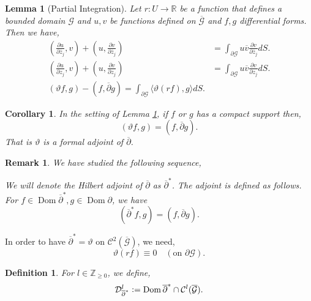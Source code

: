 \documentclass{article}
\newtheorem{definition}{Definition}[section]
\newtheorem{lemma}{Lemma}[section]
\newtheorem{remark}{Remark}[section]
\newtheorem{corollary}{Corollary} [section]
\DeclareMathOperator{\Dom}{Dom}
\newcommand{\defeq}{\vcentcolon=}
\newcommand{\R}[0]{\mathbb{R}}
\newcommand{\Z}[0]{\mathbb{Z}}
\newcommand{\G}[0]{\mathcal{G}}
\newcommand{\pd}[2]{{\frac {\partial#1} {\partial#2}}}
\newcommand{\bd}[0]{\partial}
\newcommand{\cbd}[0]{\overline{\partial}}
\begin{document}
  \begin{lemma}[Partial Integration]
    Let $r:U\to\R$ be a function that defines a bounded domain $\G$ and $u,v$ be functions defined on $\overline{\G}$ and $f,g$ differential forms. Then we have,
    \begin{align*}
      \left(\pd{u}{\overline{z}_j},v\right)+\left(u,\pd{v}{\overline{z}_j}\right)& = \int_{\bd \G}u\overline{v}\pd{v}{\overline{z}_j}dS.\\
      \left(\pd{u}{z_j},v\right)+\left(u,\pd{v}{z_j}\right)& = \int_{\bd \G}u\overline{v}\pd{v}{z_j}dS.\\
      (\vartheta f,g) - (f,\overline{\bd}g) = \int_{\bd\G}\langle\vartheta(rf),g\rangle dS.
    \end{align*}
    \label{lemma_parital_integration}
  \end{lemma}

  \begin{corollary}
    In the setting of Lemma \ref{lemma_parital_integration}, if $f$ or $g$ has a compact support then,
    \begin{equation*}
      (\vartheta f,g) = (f,\cbd g).
    \end{equation*}
    That is $\vartheta$ is a formal adjoint of $\cbd$. 
  \end{corollary}

  \begin{remark}
    We have studied the following sequence,
    \begin{center}
    \end{center}
    We will denote the Hilbert adjoint of $\cbd$ as $\cbd^*$. The adjoint is defined as follows. For $f\in\Dom\cbd^*,g\in\Dom\bd$, we have
    \begin{equation*}
      (\cbd^*f,g)=(f,\cbd g).
    \end{equation*}
  \end{remark}

  In order to have $\cbd^*=\vartheta$ on $\mathcal{C}^2(\overline{\G})$, we need,
  \begin{equation*}
    \vartheta(rf)\equiv 0\quad(\text{on $\bd\G$}).
  \end{equation*}

  \begin{definition}
    For $l\in\Z_{\geq0}$, we define,
    \begin{equation*}
      \mathcal{D}_{\cbd^*}^l\defeq\Dom\cbd^*\cap\mathcal{C}^l(\overline{\G}).
    \end{equation*}
  \end{definition}
\end{document}
